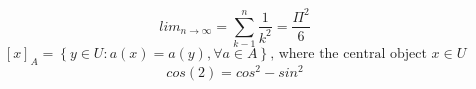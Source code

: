 \documentclass{article}
\begin{document}
\begin{equation}
lim _{n\rightarrow\infty}=\sum_{k-1}^{n}\frac{1}{k^{2}}=\frac{\Pi^{2}}{6}
\end{equation}
\begin{equation}
\left[x\right]_{A}=\left\{y\in U: a(x) = a(y),\forall a \in A\right\}\text{, where the central object } x\in U
\end{equation}
\begin{equation}
cos(2)=cos^{2}-sin^{2}
\end{equation}
\end{document}
